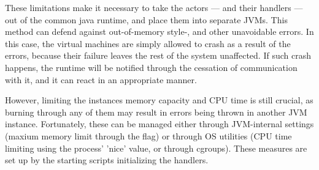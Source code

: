 	These limitations make it necessary to take the actors --- and their handlers --- out of the common java runtime, and place them into separate JVMs. This method can defend against out-of-memory style-, and other unavoidable errors. In this case, the virtual machines are simply allowed to crash as a result of the errors, because their failure leaves the rest of the system unaffected. If such crash happens, the runtime will be notified through the cessation of communication with it, and it can react in an appropriate manner.
	
	However, limiting the instances memory capacity and CPU time is still crucial, as burning through any of them may result in errors being thrown in another JVM instance. Fortunately, these can be managed either through JVM-internal settings (maxium memory limit through the  flag) or through OS utilities (CPU time limiting using the process' 'nice' value, or through cgroups). These measures are set up by the starting scripts initializing the handlers.

%








